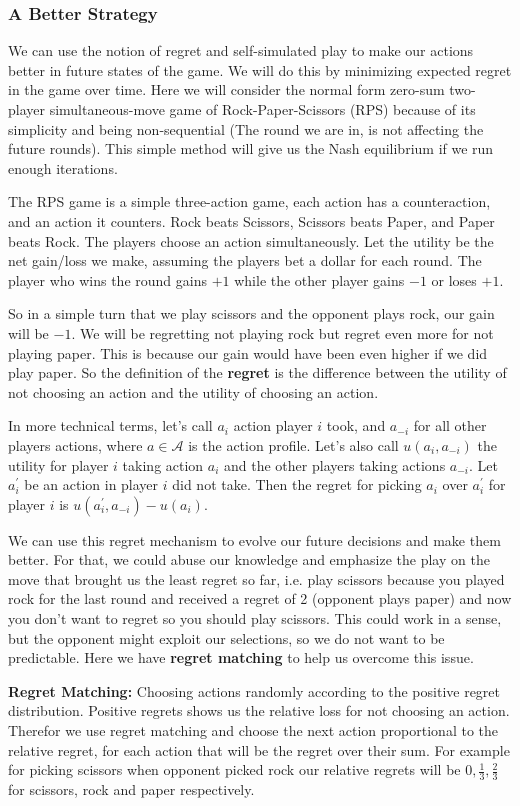 \subsubsection{A Better Strategy} %
\label{ssub:betterStrategy}
We can use the notion of regret and self-simulated play to make our actions better 
in future states of the game. We will do this by minimizing expected regret in the 
game over time. Here we will consider the normal form zero-sum two-player simultaneous-move 
game of Rock-Paper-Scissors (RPS) because of its simplicity and being non-sequential 
(The round we are in, is not affecting the future rounds). This simple method will give us 
the Nash equilibrium if we run enough iterations.

The RPS game is a simple three-action game, each action has a counteraction, and an action it counters.
Rock beats Scissors, Scissors beats Paper, and Paper beats Rock. The players choose an action
simultaneously. Let the utility be the net gain/loss we make, assuming the players bet a dollar for
each round. The player who wins the round gains $+1$ while the other player gains $-1$ or loses $+1$.  

So in a simple turn that we play scissors and the opponent plays rock, our gain will be $-1$. We will be 
regretting not playing rock but regret even more for not playing paper. This is because our gain would
have been even higher if we did play paper. So the definition of the \textbf{regret} is the difference
between the utility of not choosing an action and the utility of choosing an action.

In more technical terms, let's call $a_i$ action player $i$ took, and $a_{-i}$ for all other players
actions, where $a \in \mathcal{A}$ is the action profile. Let's also call $u(a_i, a_{-i})$ the utility 
for player $i$ taking action $a_i$ and the other players taking actions $a_{-i}$. Let $a^'_i$ be an 
action in  player $i$ did not take. Then the regret for picking $a_i$ over $a^'_i$ for player
$i$ is $u(a^'_i, a_{-i}) - u(a_i)$.

We can use this regret mechanism to evolve our future decisions and make them better. For that, we could
abuse our knowledge and emphasize the play on the move that brought us the least regret so far, i.e.
play scissors because you played rock for the last round and received a regret of 2 (opponent plays paper)
and now you don't want to regret so you should play scissors. This could work in a sense, but the opponent
might exploit our selections, so we do not want to be predictable. Here we have \textbf{regret matching}
to help us overcome this issue.

\textbf{Regret Matching:} Choosing actions randomly according to the positive regret distribution.
Positive regrets shows us the relative loss for not choosing an action. Therefor we use regret matching
and choose the next action proportional to the relative regret, for each action that will be the regret
over their sum. For example for picking scissors when opponent picked rock our relative regrets will be 
$0, \frac{1}{3}, \frac{2}{3}$ for scissors, rock and paper respectively. 


